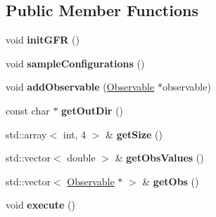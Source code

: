 \subsection*{Public Member Functions}
\begin{DoxyCompactItemize}
\item 
void {\bfseries init\+G\+FR} ()\hypertarget{classGaugeFieldReader_aa4eac4656319ffb5d397dc6dd6b4f426}{}\label{classGaugeFieldReader_aa4eac4656319ffb5d397dc6dd6b4f426}

\item 
void {\bfseries sample\+Configurations} ()\hypertarget{classGaugeFieldReader_acc45c7e6e91ccb4e1b7f8d1f65104153}{}\label{classGaugeFieldReader_acc45c7e6e91ccb4e1b7f8d1f65104153}

\item 
void {\bfseries add\+Observable} (\hyperlink{classObservable}{Observable} $\ast$observable)\hypertarget{classGaugeFieldReader_af795e0891c276b0a6c8d8ade159df3b8}{}\label{classGaugeFieldReader_af795e0891c276b0a6c8d8ade159df3b8}

\item 
const char $\ast$ {\bfseries get\+Out\+Dir} ()\hypertarget{classGaugeFieldReader_a015c7811098f42d98b7a9d5f3b52d8b4}{}\label{classGaugeFieldReader_a015c7811098f42d98b7a9d5f3b52d8b4}

\item 
std\+::array$<$ int, 4 $>$ \& {\bfseries get\+Size} ()\hypertarget{classGaugeFieldReader_a2c7cc1114b6442acdb3112409e50792f}{}\label{classGaugeFieldReader_a2c7cc1114b6442acdb3112409e50792f}

\item 
std\+::vector$<$ double $>$ \& {\bfseries get\+Obs\+Values} ()\hypertarget{classGaugeFieldReader_a470083eb93cd916886d1ea68091ee728}{}\label{classGaugeFieldReader_a470083eb93cd916886d1ea68091ee728}

\item 
std\+::vector$<$ \hyperlink{classObservable}{Observable} $\ast$ $>$ \& {\bfseries get\+Obs} ()\hypertarget{classGaugeFieldReader_a3326dd6abb58a608a387e7e91a1ed0cc}{}\label{classGaugeFieldReader_a3326dd6abb58a608a387e7e91a1ed0cc}

\item 
void {\bfseries execute} ()\hypertarget{classGaugeFieldReader_af410d62a4f0e146db40111d5be672264}{}\label{classGaugeFieldReader_af410d62a4f0e146db40111d5be672264}

\end{DoxyCompactItemize}
